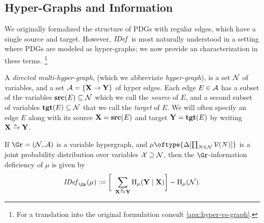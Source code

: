 \documentclass{article}
\begin{document}
    \subsection{Hyper-Graphs and Information}
    We originally formalized the structure of PDGs with regular edges, which have a single source and target. However, $\mathit{IDef}_{}$ is most naturally understood in a setting where PDGs are modeled as hyper-graphs; we now provide an characterization in these terms.%
        \footnote{For a translation into the original formulation consult \cref{apx:hyper-vs-graph}.}
    \begin{defn} \label{defn:hypergraph}
        A \emph{directed multi-hyper-graph}, (which we abbreviate \emph{hyper-graph}), is a set $\mathcal N$ of variables, and a set $\mathcal A = \{ \mathbf X \to \mathbf Y \}$ of hyper edges. Each edge $E \in \mathcal A$ has a subset of the variables $\mathbf{src}(E) \subseteq \mathcal N$ which we call the \emph{source} of $E$, and a second subset of variables $\mathbf{tgt}(E) \subseteq \mathcal N$ that we call the \emph{target} of $E$. We will often specify an edge $E$ along with its source $\mathbf X = \mathbf{src}(E)$ and target $\mathbf Y = \mathbf{tgt}(E)$ by writing $\ed E{\mat X}{\mat Y}$.
    \end{defn}

    \begin{defn} \label{defn:idef}
        If $\Gr = (\N, \Ed)$ is a variable hypergraph, and $\mu \oftype{\Delta [ \prod_{N\in\N}\V(N)]}$ is a joint probability distribution over variables $\mathcal X \supseteq \mathcal N$, then the $\Gr$-information deficiency of $\mu$ is given by
        \begin{equation}
            \IDef{\Gr}(\mu) := \bigg[~\sum_{\ed E{\mat X}{\mat Y}} \H_\mu(\mat Y\mid \mat X)\bigg] - \H_\mu(\N).
            \label{eq:idef}
        \end{equation}
    \end{defn}
\end{document}
